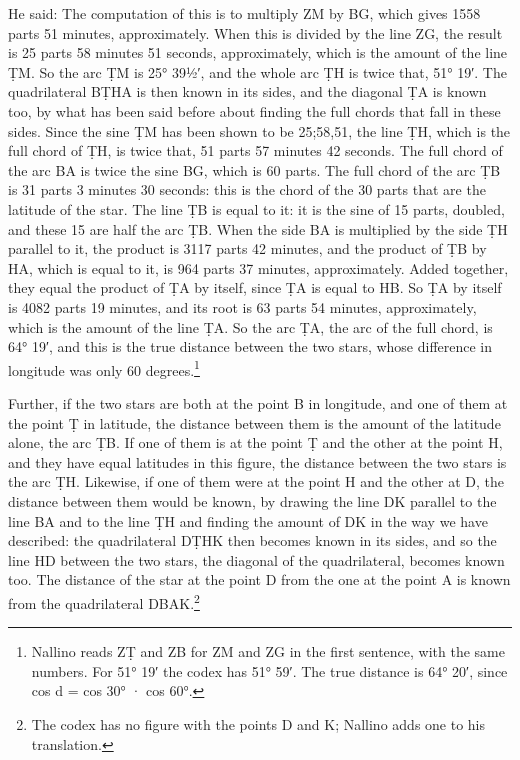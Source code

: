 \documentclass[11pt]{article}
\newcommand{\ArPage}[1]{\marginpar{\footnotesize\color{gray}Ar.\,p.\,#1}}
\begin{document}
\par \ArPage{59}He said: The computation of this is to multiply ZM by BG, which gives 1558 parts 51 minutes, approximately. When this is divided by the line ZG, the result is 25 parts 58 minutes 51 seconds, approximately, which is the amount of the line ṬM. So the arc ṬM is 25° 39½′, and the whole arc ṬH is twice that, 51° 19′. The quadrilateral BṬHA is then known in its sides, and the diagonal ṬA is known too, by what has been said before about finding the full chords that fall in these sides. Since the sine ṬM has been shown to be 25;58,51, the line ṬH, which is the full chord of ṬH, is twice that, 51 parts 57 minutes 42 seconds. The full chord of the arc BA is twice the sine BG, which is 60 parts. The full chord of the arc ṬB is 31 parts 3 minutes 30 seconds: this is the chord of the 30 parts that are the latitude of the star. The line ṬB is equal to it: it is the sine of 15 parts, doubled, and these 15 are half the arc ṬB. When the side BA is multiplied by the side ṬH parallel to it, the product is 3117 parts 42 minutes, and the product of ṬB by HA, which is equal to it, is 964 parts 37 minutes, approximately. Added together, they equal the product of ṬA by itself, since ṬA is equal to HB. So ṬA by itself is 4082 parts 19 minutes, and its root is 63 parts 54 minutes, approximately, which is the amount of the line ṬA. So the arc ṬA, the arc of the full chord, is 64° 19′, and this is the true distance between the two stars, whose difference in longitude was only 60 degrees.\footnote{Nallino reads ZṬ and ZB for ZM and ZG in the first sentence, with the same numbers. For 51° 19′ the codex has 51° 59′. The true distance is 64° 20′, since cos d = cos 30° · cos 60°.}\par
\par Further, if the two stars are both at the point B in longitude, and one of them at the point Ṭ in latitude, the distance between them is the amount of the latitude alone, the arc ṬB. If one of them is at the point Ṭ and the other at the point H, and they have equal latitudes in this figure, the distance between the two stars is the arc ṬH. Likewise, if one of them were at the point H and the other at D, the distance between them would be known, by drawing the line DK parallel to the line BA and to the line ṬH and finding the amount of DK in the way we have described: the quadrilateral DṬHK then becomes known in its sides, and so the line HD between the two stars, the diagonal of the quadrilateral, becomes known too. The distance of the star at the point D from the one at the point A is known from the quadrilateral DBAK.\footnote{The codex has no figure with the points D and K; Nallino adds one to his translation.}\par
\end{document}
